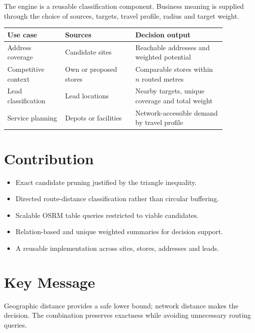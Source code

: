 \documentclass[a0,portrait]{a0poster}
\begin{document}
\begin{multicols}{2}
The engine is a reusable classification component. Business meaning is supplied
through the choice of sources, targets, travel profile, radius and target weight.

\begin{center}
\begin{tabular}{L{0.23\linewidth} L{0.29\linewidth} L{0.36\linewidth}}
\toprule
\textbf{Use case} & \textbf{Sources} & \textbf{Decision output} \\
\midrule
Address coverage & Candidate sites & Reachable addresses and weighted potential \\
Competitive context & Own or proposed stores & Comparable stores within $n$ routed metres \\
Lead classification & Lead locations & Nearby targets, unique coverage and total weight \\
Service planning & Depots or facilities & Network-accessible demand by travel profile \\
\bottomrule
\end{tabular}
\end{center}


\section*{Contribution}

\begin{itemize}
  \item Exact candidate pruning justified by the triangle inequality.
  \item Directed route-distance classification rather than circular buffering.
  \item Scalable OSRM table queries restricted to viable candidates.
  \item Relation-based and unique weighted summaries for decision support.
  \item A reusable implementation across sites, stores, addresses and leads.
\end{itemize}

\color{PosterOrange}
\section*{Key Message}

\Large
Geographic distance provides a safe lower bound; network distance makes the
decision. The combination preserves exactness while avoiding unnecessary routing
queries.

\end{multicols}
\end{document}
